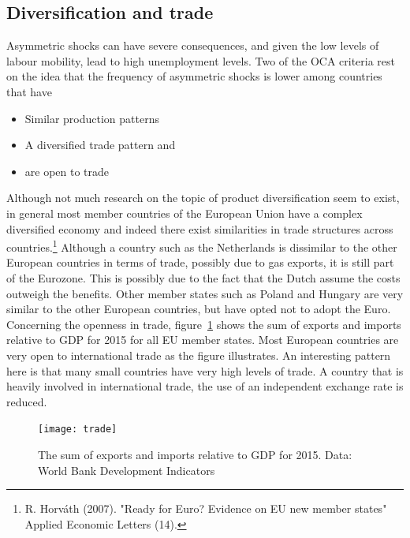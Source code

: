 \documentclass{tufte-handout}
\begin{document}
\subsection{Diversification and trade}
Asymmetric shocks can have severe consequences, and given the low levels of labour mobility, lead to high unemployment levels. 
Two of the OCA criteria rest on the idea that the frequency of asymmetric shocks is lower among countries that have 
\begin{itemize}
  \item Similar production patterns
  \item A diversified trade pattern and
  \item are open to trade
\end{itemize}

Although not much research on the topic of product diversification seem to exist, in general most member countries of the European Union have a complex diversified economy and indeed there exist similarities in trade structures across countries.\footnote{R. Horv\'ath (2007). "Ready for Euro? Evidence on EU new member states" Applied Economic Letters (14).}
Although a country such as the Netherlands is dissimilar to the other European countries in terms of trade, possibly due to gas exports, it is still part of the Eurozone. 
This is possibly due to the fact that the Dutch assume the costs outweigh the benefits. 
Other member states such as Poland and Hungary are very similar to the other European countries, but have opted not to adopt the Euro.
Concerning the openness in trade, figure~\ref{fig:trade} shows the sum of exports and imports relative to GDP for 2015 for all EU member states. 
Most European countries are very open to international trade as the figure illustrates.
An interesting pattern here is that many small countries have very high levels of trade.
A country that is heavily involved in international trade, the use of an independent exchange rate is reduced.
\begin{figure}
  \texttt{[image: trade]}
  \label{fig:trade}
  \caption{The sum of exports and imports relative to GDP for 2015. Data: World Bank Development Indicators}
\end{figure}

\end{document}
